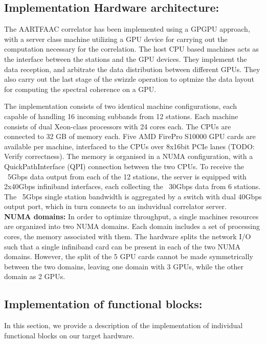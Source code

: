 \documentclass{ws-jai}
\begin{document}
\subsection  {Implementation  Hardware  architecture:} 
The AARTFAAC  correlator has  been implemented  using a  GPGPU approach,  with a
server class  machine utilizing a  GPU device  for carrying out  the computation
necessary  for  the correlation.   The  host  CPU  based  machines acts  as  the
interface between  the stations  and the  GPU devices.  They implement  the data
reception, and arbitrate the data distribution between different GPUs. They also
carry out the last stage of the swizzle operation to optmize the data layout for
computing the spectral coherence on a GPU.

The  implementation  consists  of  two identical  machine  configurations,  each
capable of handling 16 incoming subbands from 12 stations. Each machine consists
of dual Xeon-class processors  with 24 cores each. The CPUs  are connected to 32
GB of memory each. Five AMD FirePro  S10000 GPU cards are available per machine,
interfaced to the CPUs over 8x16bit  PCIe lanes (TODO: Verify correctness).  The
memory is  organised in  a NUMA configuration,  with a  QuickPathInterface (QPI)
connection between the two CPUs. To receive  the ~5Gbps data output from each of
the 12  stations, the  server is equipped  with 2x40Gbps  infiniband interfaces,
each collecting  the ~30Gbps data  from 6  stations.  The ~5Gbps  single station
bandwidth is aggregated by a switch with  dual 40Gbps output port, which in turn
connects to an induvidual correlator server.\\

\textbf  {NUMA domains:}  In order  to  optimize throughput,  a single  machines
resources are  organized into two  NUMA domains. Each  domain includes a  set of
processing  cores, the  memory associated  with  them. The  hardware splits  the
network I/O such that a single infiniband card can be present in each of the two
NUMA domains. However, the split of the 5 GPU cards cannot be made symmetrically
between the two domains, leaving one domain  with 3 GPUs, while the other domain
as 2 GPUs.

\subsection {Implementation of functional  blocks:} 

In this  section, we provide a  description of the implementation  of individual
functional blocks on our target hardware.
\end{document}
